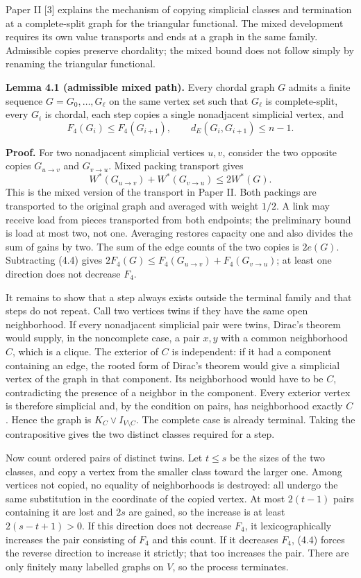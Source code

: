 \documentclass[english,11pt,a4paper]{article}
\begin{document}
Paper II {[}3{]} explains the mechanism of copying simplicial classes and termination at a complete-split graph for the triangular functional. The mixed development requires its own value transports and ends at a graph in the same family. Admissible copies preserve chordality; the mixed bound does not follow simply by renaming the triangular functional.


\textbf{Lemma 4.1 (admissible mixed path).} Every chordal graph \(G\) admits a finite sequence \(G=G_0,\ldots,G_\ell\) on the same vertex set such that \(G_\ell\) is complete-split, every \(G_i\) is chordal, each step copies a single nonadjacent simplicial vertex, and \[
F_4(G_i)\le F_4(G_{i+1}),\qquad
d_E(G_i,G_{i+1})\le n-1.
\tag{4.3}
\]

\textbf{Proof.} For two nonadjacent simplicial vertices \(u,v\), consider the two opposite copies \(G_{u\to v}\) and \(G_{v\to u}\). Mixed packing transport gives \[
W^*(G_{u\to v})+W^*(G_{v\to u})\le2W^*(G).
\tag{4.4}
\] This is the mixed version of the transport in Paper II. Both packings are transported to the original graph and averaged with weight \(1/2\). A link may receive load from pieces transported from both endpoints; the preliminary bound is load at most two, not one. Averaging restores capacity one and also divides the sum of gains by two. The sum of the edge counts of the two copies is \(2e(G)\). Subtracting (4.4) gives \(2F_4(G)\le F_4(G_{u\to v})+F_4(G_{v\to u})\); at least one direction does not decrease \(F_4\).

It remains to show that a step always exists outside the terminal family and that steps do not repeat. Call two vertices twins if they have the same open neighborhood. If every nonadjacent simplicial pair were twins, Dirac's theorem would supply, in the noncomplete case, a pair \(x,y\) with a common neighborhood \(C\), which is a clique. The exterior of \(C\) is independent: if it had a component containing an edge, the rooted form of Dirac's theorem would give a simplicial vertex of the graph in that component. Its neighborhood would have to be \(C\), contradicting the presence of a neighbor in the component. Every exterior vertex is therefore simplicial and, by the condition on pairs, has neighborhood exactly \(C\). Hence the graph is \(K_C\vee I_{V\setminus C}\). The complete case is already terminal. Taking the contrapositive gives the two distinct classes required for a step.

Now count ordered pairs of distinct twins. Let \(t\le s\) be the sizes of the two classes, and copy a vertex from the smaller class toward the larger one. Among vertices not copied, no equality of neighborhoods is destroyed: all undergo the same substitution in the coordinate of the copied vertex. At most \(2(t-1)\) pairs containing it are lost and \(2s\) are gained, so the increase is at least \(2(s-t+1)>0\). If this direction does not decrease \(F_4\), it lexicographically increases the pair consisting of \(F_4\) and this count. If it decreases \(F_4\), (4.4) forces the reverse direction to increase it strictly; that too increases the pair. There are only finitely many labelled graphs on \(V\), so the process terminates.
\end{document}
